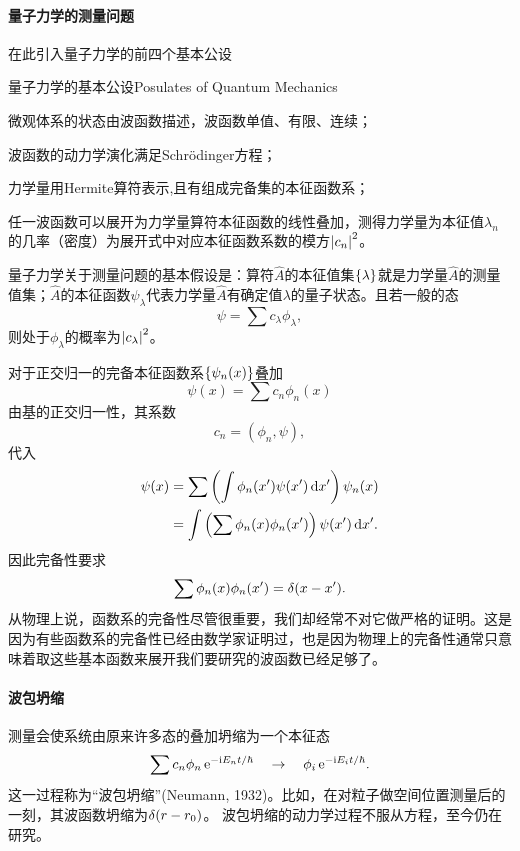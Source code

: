 \paragraph*{量子力学的测量问题}在此引入量子力学的前四个基本公设
\begin{theorem}{量子力学的基本公设}{Posulates of Quantum Mechanics}
	\begin{compactenum}
		\item 微观体系的状态由波函数描述，波函数单值、有限、连续；
		\item 波函数的动力学演化满足Schrödinger方程；
		\item 力学量用Hermite算符表示,且有组成完备集的本征函数系；
		\item 任一波函数可以展开为力学量算符本征函数的线性叠加，测得力学量为本征值$\lambda_n$的几率（密度）为展开式中对应本征函数系数的模方$\left\lvert c_n\right\rvert^2$。
	\end{compactenum}
\end{theorem}
量子力学关于测量问题的基本假设是：算符$\hat A$的本征值集$\left\{\lambda\right\}$就是力学量$\hat A$的测量值集；$\hat A$的本征函数$\psi_\lambda$代表力学量$\hat A$有确定值$\lambda$的量子状态。且若一般的态
\[
	\psi=\sum c_\lambda\phi_\lambda,
\]
则处于$\phi_\lambda$的概率为$\left\lvert c_\lambda\right\rvert^2$。

对于正交归一的完备本征函数系$\left\{\psi_n(x)\right\}$叠加
\[
	\psi(x)=\sum c_n\phi_n(x)
\]
由基的正交归一性，其系数
\[
c_n=(\phi_n,\psi),
\]
代入
\begin{align*}
	\psi(x) & =\sum\left(\int\phi_n(x')\psi(x')\mathop{}\!\mathrm{d} x'\right)\psi_n(x)  \\
	        & =\int\left(\sum\phi_n(x)\phi_n(x')\right)\psi(x')\mathop{}\!\mathrm{d} x'.
\end{align*}
因此完备性要求
\begin{align}
	\sum \phi_n(x)\phi_n(x')=\mathop{}\!\delta(x-x').
\end{align}
从物理上说，函数系的完备性尽管很重要，我们却经常不对它做严格的证明。这是因为有些函数系的完备性已经由数学家证明过，也是因为物理上的完备性通常只意味着取这些基本函数来展开我们要研究的波函数已经足够了。
\paragraph*{波包坍缩}测量会使系统由原来许多态的叠加坍缩为一个本征态
\[
	\sum c_n\phi_n\mathop{}\!\mathrm{e}^{-\mathrm{i} E_nt/\hbar}\quad\rightarrow\quad\phi_i\mathop{}\!\mathrm{e}^{-\mathrm{i} E_it/\hbar}.
\]
这一过程称为“波包坍缩”(Neumann, 1932)。比如，在对粒子做空间位置测量后的一刻，其波函数坍缩为$\mathop{}\!\delta(r-r_0)$。
波包坍缩的动力学过程不服从\Schr 方程，至今仍在研究。%

